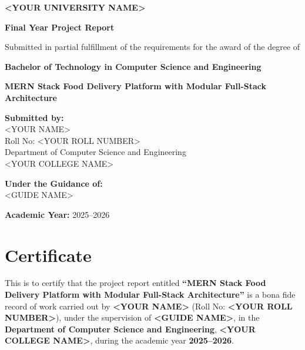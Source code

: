 \documentclass[12pt,a4paper]{report}
\newcommand{\ReportTitle}{MERN Stack Food Delivery Platform with Modular Full-Stack Architecture}
\newcommand{\StudentName}{<YOUR NAME>}
\newcommand{\RollNo}{<YOUR ROLL NUMBER>}
\newcommand{\DepartmentName}{Department of Computer Science and Engineering}
\newcommand{\CollegeName}{<YOUR COLLEGE NAME>}
\newcommand{\UniversityName}{<YOUR UNIVERSITY NAME>}
\newcommand{\GuideName}{<GUIDE NAME>}
\newcommand{\AcademicYear}{2025--2026}
\begin{document}
\begin{titlepage}
    \centering
    \vspace*{1.5cm}
    {\Large \textbf{\UniversityName} \par}
    \vspace{1.0cm}
    {\large \textbf{Final Year Project Report} \par}
    \vspace{0.8cm}
    {\large Submitted in partial fulfillment of the requirements for the award of the degree of \par}
    {\large \textbf{Bachelor of Technology in Computer Science and Engineering} \par}
    \vspace{1.5cm}
    {\LARGE \textbf{\ReportTitle} \par}
    \vspace{1.8cm}
    \begin{flushleft}
        \textbf{Submitted by:} \\
        \StudentName \\
        Roll No: \RollNo \\
        \vspace{0.5cm}
        \DepartmentName \\
        \CollegeName
    \end{flushleft}
    \vspace{1.3cm}
    \begin{flushleft}
        \textbf{Under the Guidance of:} \\
        \GuideName
    \end{flushleft}
    \vfill
    {\large \textbf{Academic Year:} \AcademicYear \par}
\end{titlepage}


\chapter*{Certificate}

This is to certify that the project report entitled \textbf{``\ReportTitle''} is a bona fide record of work carried out by \textbf{\StudentName} (Roll No: \textbf{\RollNo}), under the supervision of \textbf{\GuideName}, in the \textbf{\DepartmentName}, \textbf{\CollegeName}, during the academic year \textbf{\AcademicYear}.
\end{document}
